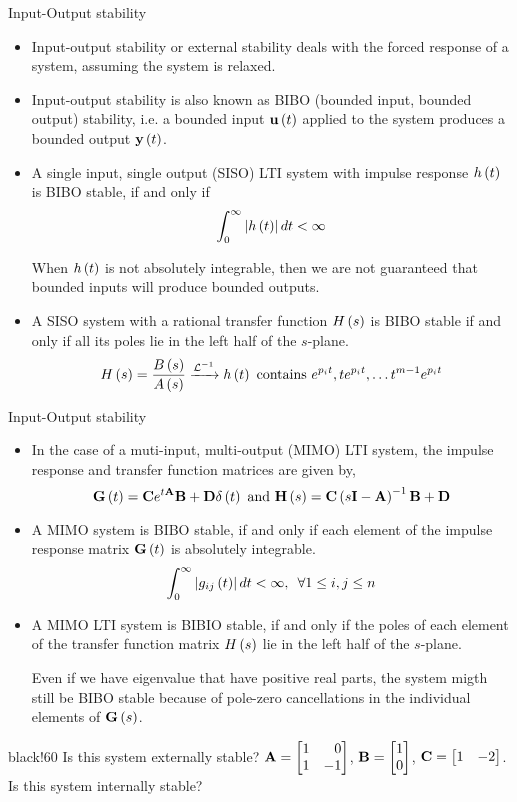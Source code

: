 \documentclass[aspectratio=169]{beamer}
\def\mf{\ensuremath\mathbf}
\def\lp{\ensuremath\left(}
\def\rp{\ensuremath\right)}
\def\lv{\ensuremath\left\lvert}
\def\rv{\ensuremath\right\rvert}
\def\bmx{\ensuremath\begin{bmatrix*}[r]}
\def\emx{\ensuremath\end{bmatrix*}}
\newcommand{\demoex}[2]{\onslide<#1->\begin{color}{black!60} #2 \end{color}}
\newcommand{\ct}[1]{\lp #1\rp}
\begin{document}
\begin{frame}{Input-Output stability}
\begin{itemize}
    \item Input-output stability or external stability deals with the forced response of a system, assuming the system is relaxed.

    \item Input-output stability is also known as BIBO (bounded input, bounded output) stability, i.e. a bounded input $\mf{u}\ct{t}$ applied to the system produces a bounded output $\mf{y}\ct{t}$.

    \item A single input, single output (SISO) LTI system with impulse response $h\ct{t}$ is BIBO stable, if and only if
    \[ \int_{0}^{\infty} \lv h\ct{t}\rv dt < \infty \]

    When $h\ct{t}$ is not absolutely integrable, then we are not guaranteed that bounded inputs will produce bounded outputs.

    \item A SISO system with a rational transfer function $H\ct{s}$ is BIBO stable if and only if all its poles lie in the left half of the $s$-plane.
    \[ H\ct{s} = \frac{B\ct{s}}{A\ct{s}} \xrightarrow{\mathcal{L}^{-1}} h\ct{t} \text{ contains } e^{p_i t}, te^{p_i t}, \ldots t^{m-1}e^{p_i t}\]
\end{itemize}
\end{frame}

\begin{frame}{Input-Output stability}
\begin{itemize}
    \item In the case of a muti-input, multi-output (MIMO) LTI system, the impulse response and transfer function matrices are given by,
    \[ \mf{G}\ct{t} = \mf{C}e^{t\mf{A}}\mf{B} + \mf{D}\delta\ct{t} \text{ and } \mf{H}\ct{s} = \mf{C}\ct{s\mf{I} - \mf{A}}^{-1}\mf{B} + \mf{D} \]

    \item A MIMO system is BIBO stable, if and only if each element of the impulse response matrix $\mf{G}\ct{t}$ is absolutely integrable.
    \[ \int_{0}^\infty \lv g_{ij}\ct{t}\rv dt < \infty , \,\,\, \forall 1 \leq i, j \leq n \]

    \item A MIMO LTI system is BIBIO stable, if and only if the poles of each element of the transfer function matrix $H\ct{s}$ lie in the left half of the $s$-plane.

    Even if we have eigenvalue that have positive real parts, the system migth still be BIBO stable because of pole-zero cancellations in the individual elements of $\mf{G}\ct{s}$.
\end{itemize}
\demoex{2}{Is this system externally stable? $\mf{A} = \bmx 1 & 0\\ 1 & -1\emx$, $\mf{B} = \bmx 1 \\ 0\emx$, $\mf{C} = \bmx 1 & -2\emx$. Is this system internally stable?}
\end{frame} 
\end{document}
